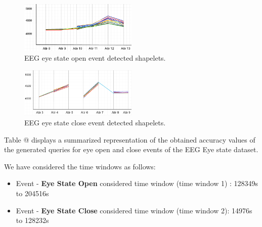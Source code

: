 \documentclass[conference]{IEEEtran}  %
\makeatletter
\newcommand*{\rom}[1]{\expandafter\@slowromancap\romannumeral #1@}
\makeatother
\begin{document}
\begin{figure}[h!]
\includegraphics[width=0.5\textwidth]{EEG_event1.png}
\caption{EEG eye state open event detected shapelets.}
\label{fig:EEGEvent1}
\end{figure}

\begin{figure}[h!]
\includegraphics[width=0.5\textwidth]{EEG_event2.png}
\caption{EEG eye state close event detected shapelets.}
\label{fig:EEGevent2}
\end{figure}

Table \rom{2} displays a summarized representation of the obtained accuracy values of the generated queries for eye open and close events of the EEG Eye state dataset.

We have considered the time windows as follows:
\begin{itemize}
\item Event - \textbf{Eye State Open} considered time window (time window 1) : 128349s to 204516s
\item Event - \textbf{Eye State Close} considered time window (time window 2):
14976s to 128232s
\end{itemize}
\end{document}
